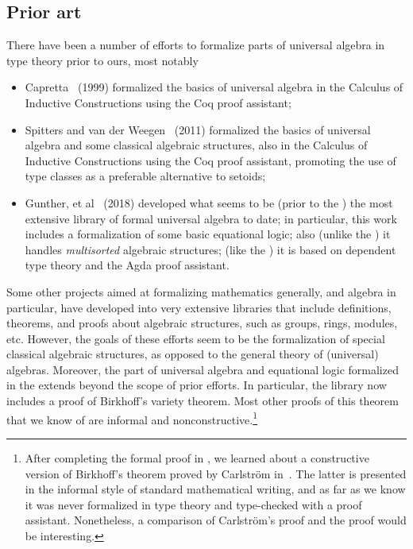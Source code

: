 \subsection{Prior art}\label{sec:prior-art}

There have been a number of efforts to formalize parts of universal algebra in type theory prior to ours, most notably
\begin{itemize}
  \item Capretta~\cite{Capretta:1999} (1999) formalized the basics of universal algebra in the Calculus of Inductive Constructions using the Coq proof assistant;
    \item Spitters and van der Weegen~\cite{Spitters:2011} (2011) formalized the basics of universal algebra and some classical algebraic structures, also in the Calculus of Inductive Constructions using the Coq proof assistant, promoting the use of type classes as a preferable alternative to setoids;
 \item Gunther, et al~\cite{Gunther:2018} (2018) developed what seems to be (prior to the \ualib) the most extensive library of formal universal algebra to date; in particular, this work includes a formalization of some basic equational logic; also (unlike the \ualib) it handles \emph{multisorted} algebraic structures; (like the \ualib) it is based on dependent type theory and the Agda proof assistant.
\end{itemize}
Some other projects aimed at formalizing mathematics generally, and algebra in particular, have developed into very extensive libraries that include definitions, theorems, and proofs about algebraic structures, such as groups, rings, modules, etc.  However, the goals of these efforts seem to be the formalization of special classical algebraic structures, as opposed to the general theory of (universal) algebras. Moreover, the part of universal algebra and equational logic formalized in the \ualib extends beyond the scope of prior efforts. In particular, the library now includes a proof of Birkhoff's variety theorem.  Most other proofs of this theorem that we know of are informal and nonconstructive.\footnote{After completing the formal proof in \agda, we learned about a constructive version of Birkhoff's theorem proved by Carlstr\"om in~\cite{Carlstrom:2008}.  The latter is presented in the informal style of standard mathematical writing, and as far as we know it was never formalized in type theory and type-checked with a proof assistant. Nonetheless, a comparison of Carlstr\"om's proof and the \ualib proof would be interesting.}




